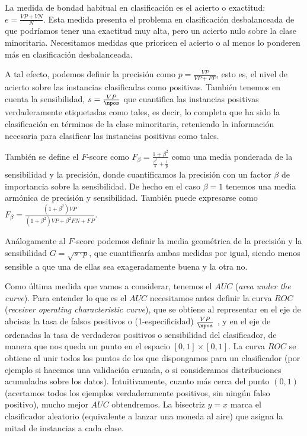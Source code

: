 La medida de bondad habitual en clasificación es el acierto o exactitud: $e = \frac{VP + VN}{N}$. Esta medida presenta el
problema en clasificación desbalanceada de que podríamos tener una exactitud muy alta, pero un acierto nulo sobre la clase 
minoritaria. Necesitamos medidas que prioricen el acierto o al menos lo ponderen más en clasificación desbalanceada.

A tal efecto, podemos definir la precisión como $p = \frac{VP}{VP + FP}$, esto es, el nivel de acierto sobre las instancias 
clasificadas como positivas. También tenemos en cuenta la sensibilidad, $s = \frac{VP}{\npos}$ que cuantifica las instancias
positivas verdaderamente etiquetadas como tales, es decir, lo completa que ha sido la clasificación en términos de la clase
minoritaria, reteniendo la información necesaria para clasificar las instancias positivas como tales.

También se define el $F$-score como $F_{\beta} = \frac{1 + \beta^2}{\frac{\beta^2}{s} + \frac{1}{p}}$ como una media 
ponderada de la sensibilidad y la precisión, donde cuantificamos la precisión con un factor $\beta$ de importancia sobre 
la sensibilidad. De hecho en el caso $\beta = 1$ tenemos una media armónica de precisión y sensibilidad. También puede 
expresarse como $F_{\beta} = \frac{(1+\beta^2) VP}{(1+\beta^2) VP + \beta^2 FN + FP}$.

Análogamente al $F$-score podemos definir la media geométrica de la precisión y la sensibilidad $G = \sqrt{s\cdot p}$, que
cuantificaría ambas medidas por igual, siendo menos sensible a que una de ellas sea exageradamente buena y la otra no.

Como última medida que vamos a considerar, tenemos el $AUC$ (\textit{area under the curve}). Para entender lo que es el $AUC$
necesitamos antes definir la curva $ROC$ (\textit{receiver operating characteristic curve}), que se obtiene al representar en el eje
de abcisas la tasa de falsos positivos o (1-especificidad) $\frac{VP}{\npos}$ , y en el eje de ordenadas la tasa de verdaderos positivos
o sensibilidad del clasificador, de manera que nos queda un punto en el espacio $[0,1]\times [0,1]$. La curva $ROC$ se obtiene al unir 
todos los puntos de los que dispongamos para un clasificador (por ejemplo si hacemos una validación cruzada, o si consideramos distribuciones
acumuladas sobre los datos). Intuitivamente, cuanto más cerca del punto $(0,1)$ (acertamos todos los ejemplos verdaderamente positivos,
sin ningún falso positivo), mucho mejor $AUC$ obtendremos. La bisectriz $y=x$ marca el clasificador aleatorio (equivalente a lanzar 
una moneda al aire) que asigna la mitad de instancias a cada clase.

